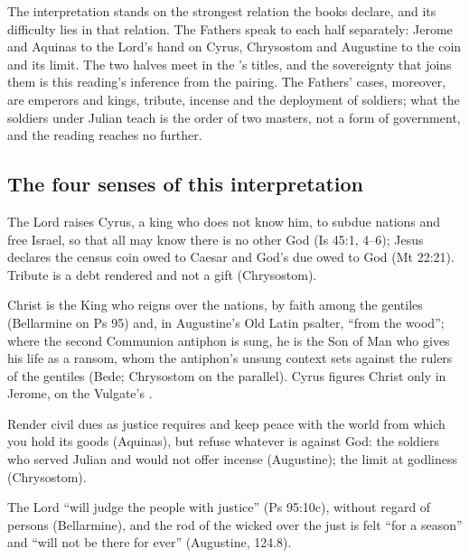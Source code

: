 The interpretation stands on the strongest relation the books declare, and its
difficulty lies in that relation. The Fathers speak to each half separately:
Jerome and Aquinas to the Lord's hand on Cyrus, Chrysostom and Augustine to
the coin and its limit. The two halves meet in the 's titles, and
the sovereignty that joins them is this reading's inference from the pairing.
The Fathers' cases, moreover, are emperors and kings, tribute, incense and the
deployment of soldiers; what the soldiers under Julian teach is the order of
two masters, not a form of government, and the reading reaches no further.

\subsection{The four senses of this interpretation}

\begin{fourSenses}
\item[Literal.] The Lord raises Cyrus, a king who does not know him, to subdue
nations and free Israel, so that all may know there is no other God (Is 45:1,
4--6); Jesus declares the census coin owed to Caesar and God's due owed to God
(Mt 22:21). Tribute is a debt rendered and not a gift (Chrysostom).
\item[Allegorical.] Christ is the King who reigns over the nations, by faith
among the gentiles (Bellarmine on Ps 95) and, in Augustine's Old Latin
psalter, ``from the wood''; where the second Communion antiphon is sung, he is
the Son of Man who gives his life as a ransom, whom the antiphon's unsung
context sets against the rulers of the gentiles (Bede; Chrysostom on the
parallel). Cyrus figures Christ only in Jerome, on the Vulgate's
.
\item[Moral.] Render civil dues as justice requires and keep peace with the
world from which you hold its goods (Aquinas), but refuse whatever is against
God: the soldiers who served Julian and would not offer incense (Augustine);
the limit at godliness (Chrysostom).
\item[Anagogical.] The Lord ``will judge the people with justice'' (Ps
95:10c), without regard of persons (Bellarmine), and the rod of the wicked over
the just is felt ``for a season'' and ``will not be there for ever''
(Augustine,  124.8).
\end{fourSenses}
